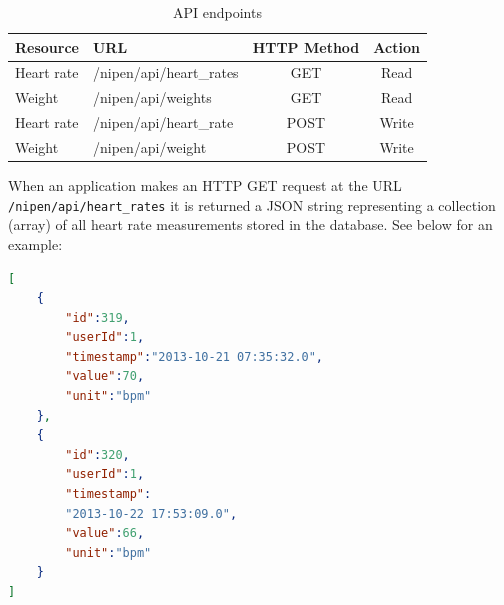 \begin{table}[h]
\begin{center}
\begin{tabular}{ | l | l | c | c | }
	\hline
	Resource	& URL						& HTTP Method 	& Action \\
	\hline
	Heart rate	& /nipen/api/heart\_rates	& GET			& Read \\
	Weight		& /nipen/api/weights		& GET			& Read \\
	Heart rate	& /nipen/api/heart\_rate	& POST			& Write \\
	Weight		& /nipen/api/weight			& POST			& Write \\
	\hline
\end{tabular}
\end{center}
\caption{API endpoints}
\label{table:api}
\end{table}

When an application makes an HTTP GET request at the URL \verb|/nipen/api/heart_rates| it is returned a JSON string representing a collection (array) of all heart rate measurements stored in the database.
See below for an example:
\begin{lstlisting}[language=json]
[
	{
		"id":319,
		"userId":1,
		"timestamp":"2013-10-21 07:35:32.0",
		"value":70,
		"unit":"bpm"
	},
	{
		"id":320,
		"userId":1,
		"timestamp":
		"2013-10-22 17:53:09.0",
		"value":66,
		"unit":"bpm"
	}
]
\end{lstlisting}
\label{listing:jsonarray}

